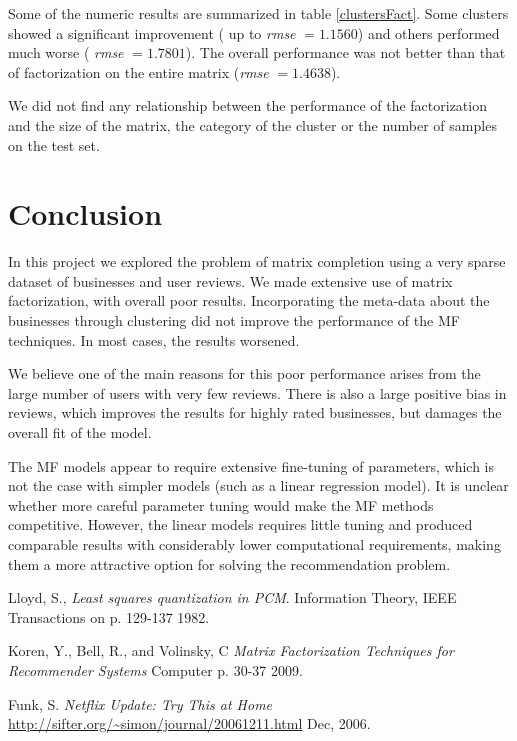 \documentclass[12pt]{article}
\begin{document}
Some of the numeric results are summarized in table \ref{clustersFact}. Some clusters showed a significant improvement ( up to \emph{rmse} $= 1.1560$) and others performed much worse ( \emph{rmse} $= 1.7801$). The overall performance was not better than that of factorization on the entire matrix (\emph{rmse} $= 1.4638 $).

We did not find any relationship between the performance of the factorization and the size of the matrix, the category of the cluster or the number of samples on the test set. 

\section{Conclusion}\label{conc}

In this project we explored the problem of matrix completion using a very sparse dataset of businesses and user reviews. We made extensive use of matrix factorization, with overall poor results. Incorporating the meta-data about the businesses through clustering did not improve the performance of the MF techniques. In most cases, the results worsened.

We believe one of the main reasons for this poor performance arises from the large number of users with very few reviews. There is also a large positive bias in reviews, which improves the results for highly rated businesses, but damages the overall fit of the model. 

The MF models appear to require extensive fine-tuning of parameters, which is not the case with simpler models (such as a linear regression model). It is unclear whether more careful parameter tuning would make the MF methods competitive. However, the linear models requires little tuning and produced comparable results with considerably lower computational requirements, making them a more attractive option for solving the recommendation problem.

\begin{thebibliography}{9}

  Lloyd, S.,
  \emph{Least squares quantization in PCM}.
  Information Theory, IEEE Transactions on
  p. 129-137
  1982.

  Koren, Y., Bell, R., and Volinsky, C
  \emph{Matrix Factorization Techniques for Recommender Systems}
  Computer
  p. 30-37
  2009.

  Funk, S.
  \emph{Netflix Update: Try This at Home}
  \url{http://sifter.org/~simon/journal/20061211.html}
  Dec, 2006.

\end{thebibliography}
\end{document}

